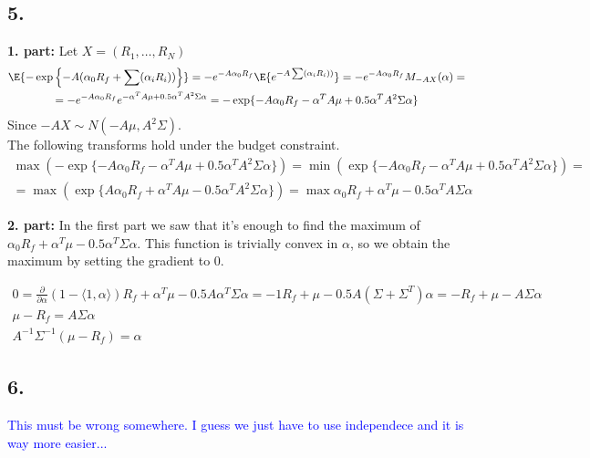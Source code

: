 \subsection*{5.}

\textbf{1. part:} Let $X=(R_1,\ldots,R_N)$ 
\begin{gather*}
\E{ - \exp\left\{-A(\alpha_0R_f+\sum(\alpha_i R_i))\right\}} = - e^ {-A\alpha_0R_f} \E{e^{-A\sum(\alpha_i R_i))}} =
- e^ {-A\alpha_0R_f} M_{-AX}(\alpha) = \\
= - e^ {-A\alpha_0R_f} e^{-\alpha^T A \mu +0.5 \alpha^T A^2 \Sigma \alpha} = - \exp \{-A\alpha_0R_f-\alpha^T A \mu +0.5 \alpha^T A^2 \Sigma \alpha\}
\end{gather*}
Since $-AX \sim  N(-A\mu, A^2 \Sigma)$. \\
The following transforms hold under the budget constraint. 
\begin{gather*}
 \max( - \exp \{-A\alpha_0R_f-\alpha^T A \mu +0.5 \alpha^T A^2 \Sigma \alpha\}) = 
 \min (\exp \{-A\alpha_0R_f-\alpha^T A \mu +0.5 \alpha^T A^2 \Sigma \alpha\}) = \\ =
 \max (\exp \{A\alpha_0R_f+\alpha^T A \mu -0.5 \alpha^T A^2 \Sigma \alpha\}) = \max \alpha_0R_f+\alpha^T  \mu -0.5 \alpha^T A \Sigma \alpha\
\end{gather*}

\textbf{2. part:}
In the first part we saw that it's enough to find the maximum of $\alpha_0R_f+\alpha^T\mu-0.5 \alpha^T \Sigma \alpha$. This function is trivially convex in $\alpha$, so we obtain the maximum by setting the gradient to $0$.

\begin{gather*}
    0 = \frac{\partial}{\partial\alpha} (1- \langle 1, \alpha \rangle)R_f +\alpha^T \mu -0.5 A \alpha^T \Sigma \alpha =
    -1 R_f + \mu -0.5 A (\Sigma + \Sigma^T) \alpha =
    - R_f + \mu - A \Sigma \alpha \\
    \mu - R_f = A \Sigma \alpha \\
    A^{-1} \Sigma^{-1} (\mu -R_f) = \alpha 
\end{gather*}

\subsection*{6.} \textcolor{blue}{This must be wrong somewhere. I guess we just have to use independece and it is way more easier...} \\

